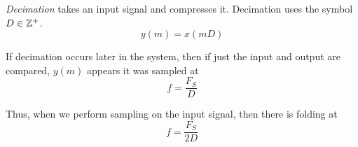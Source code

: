 \begin{definition}[Decimation]\label{def:Decimation}
  \emph{Decimation} takes an input signal and compresses it.
  Decimation uses the symbol $D \in \operatorname{\mathbb{Z}^{+}}$.
  \begin{equation*}
    y(m) = x(mD)
  \end{equation*}

  If decimation occurs later in the system, then if just the input and output are compared, $y(m)$ appears it was sampled at
  \begin{equation}\label{eq:Input_Output_Decimation}
    f = \frac{F_{S}}{D}
  \end{equation}
  
  Thus, when we perform sampling on the input signal, then there is folding at
  \begin{equation}\label{eq:Decimation_Sampling_Frequency_Change}
    f = \frac{F_{S}}{2D}
  \end{equation}
\end{definition}

